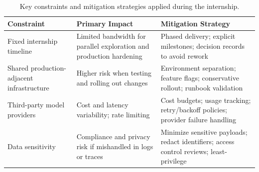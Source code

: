 \begin{table}[htbp]
    \centering
    \captionsetup{font=normalsize}
    \footnotesize
    \label{tab:Constraints}
    \begin{tabularx}{\textwidth}{|p{2.5cm}|X|X|}
        \hline
        \textbf{Constraint}                       & \textbf{Primary Impact}                                             & \textbf{Mitigation Strategy}                                                             \\
        \hline
        Fixed internship timeline                 & Limited bandwidth for parallel exploration and production hardening & Phased delivery; explicit milestones; decision records to avoid rework                   \\
        \hline
        Shared production-adjacent infrastructure & Higher risk when testing and rolling out changes                    & Environment separation; feature flags; conservative rollout; runbook validation          \\
        \hline
        Third-party model providers               & Cost and latency variability; rate limiting                         & Cost budgets; usage tracking; retry/backoff policies; provider failure handling          \\
        \hline
        Data sensitivity                          & Compliance and privacy risk if mishandled in logs or traces         & Minimize sensitive payloads; redact identifiers; access control reviews; least-privilege \\
        \hline
    \end{tabularx}
    \caption{Key constraints and mitigation strategies applied during the internship.}
\end{table}